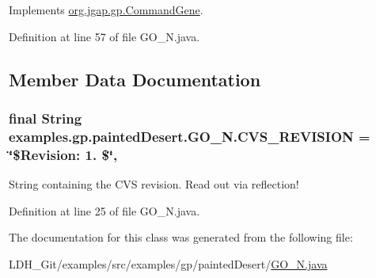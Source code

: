 Implements \hyperlink{classorg_1_1jgap_1_1gp_1_1_command_gene_a236141d99059da808afe7a9217e411c7}{org.\-jgap.\-gp.\-Command\-Gene}.



Definition at line 57 of file G\-O\-\_\-\-N.\-java.



\subsection{Member Data Documentation}
\hypertarget{classexamples_1_1gp_1_1painted_desert_1_1_g_o___n_a77e416abda401f216bf6d87867347658}{
\subsubsection[{C\-V\-S\-\_\-\-R\-E\-V\-I\-S\-I\-O\-N}]{\setlength{\rightskip}{0pt plus 5cm}final String examples.\-gp.\-painted\-Desert.\-G\-O\-\_\-\-N.\-C\-V\-S\-\_\-\-R\-E\-V\-I\-S\-I\-O\-N = \char`\"{}\$Revision\-: 1. \$\char`\"{}\hspace{0.3cm}{\ttfamily [static]}, {\ttfamily [private]}}}\label{classexamples_1_1gp_1_1painted_desert_1_1_g_o___n_a77e416abda401f216bf6d87867347658}
String containing the C\-V\-S revision. Read out via reflection! 

Definition at line 25 of file G\-O\-\_\-\-N.\-java.



The documentation for this class was generated from the following file\-:\begin{DoxyCompactItemize}
\item 
L\-D\-H\-\_\-\-Git/examples/src/examples/gp/painted\-Desert/\hyperlink{_g_o___n_8java}{G\-O\-\_\-\-N.\-java}\end{DoxyCompactItemize}
